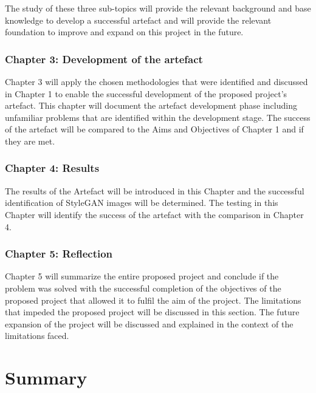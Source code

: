 The study of these three sub-topics will provide the relevant background and base knowledge to develop a successful artefact and will provide the relevant foundation to improve and expand on this project in the future.

\subsubsection*{Chapter 3: Development of the artefact}

Chapter 3 will apply the chosen methodologies that were identified and discussed in Chapter 1 to enable the successful development of the proposed project's artefact. This chapter will document the artefact development phase including unfamiliar problems that are identified within the development stage. The success of the artefact will be compared to the Aims and Objectives of Chapter 1 and if they are met.

\subsubsection*{Chapter 4: Results}

The results of the Artefact will be introduced in this Chapter and the successful identification of StyleGAN images will be determined. The testing in this Chapter will identify the success of the artefact with the comparison in Chapter 4.

\subsubsection*{Chapter 5: Reflection}

Chapter 5 will summarize the entire proposed project and conclude if the problem was solved with the successful completion of the objectives of the proposed project that allowed it to fulfil the aim of the project. The limitations that impeded the proposed project will be discussed in this section. The future expansion of the project will be discussed and explained in the context of the limitations faced.

\section{Summary}



